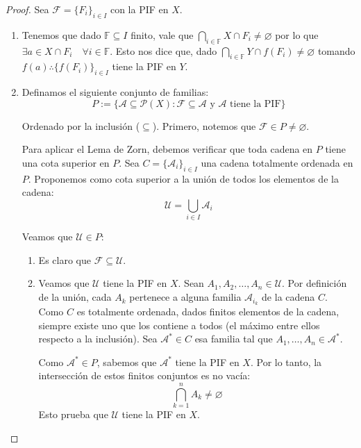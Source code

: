 \documentclass{article}
\theoremstyle{plain}
\theoremstyle{definition}
\begin{document}
\begin{proof}
    Sea \( \mathcal{F} = {\{ F_i \}}_{i \in I} \) con la PIF en \( X \).
    \begin{enumerate}
        \item Tenemos que dado \( \mathbb{F} \subseteq I \) finito, vale que \( \bigcap_{i \in \mathbb{F}} X \cap F_i \neq \varnothing \) por lo que \( \exists a \in X \cap F_i \quad \forall i \in \mathbb{F} \).
              Esto nos dice que, dado \( \bigcap_{i \in \mathbb{F}} Y \cap f(F_i) \neq \varnothing \) tomando \( f(a) \therefore {\{ f(F_i) \}}_{i \in I} \) tiene la PIF en \( Y \).
        \item Definamos el siguiente conjunto de familias:
              \[ P := \{ \mathcal{A} \subseteq \mathcal{P}(X) : \mathcal{F} \subseteq \mathcal{A} \text{ y } \mathcal{A} \text{ tiene la PIF} \} \]

              Ordenado por la inclusión (\( \subseteq \)). Primero, notemos que \( \mathcal{F} \in P \neq \varnothing \).

              Para aplicar el Lema de Zorn, debemos verificar que toda cadena en \( P \) tiene una cota superior en \( P \).
              Sea \( C = {\{ \mathcal{A}_i \}}_{i \in I} \) una cadena totalmente ordenada en \( P \). Proponemos como cota superior a la unión de todos los elementos de la cadena:
              \[ \mathcal{U} = \bigcup_{i \in I} \mathcal{A}_i \]

              Veamos que \( \mathcal{U} \in P \):
              \begin{enumerate}
                  \item Es claro que \( \mathcal{F} \subseteq \mathcal{U} \).
                  \item Veamos que \( \mathcal{U} \) tiene la PIF en \( X \). Sean \( A_1, A_2, \ldots, A_n \in \mathcal{U} \).
                        Por definición de la unión, cada \( A_k \) pertenece a alguna familia \( \mathcal{A}_{i_k} \) de la cadena \( C \).
                        Como \( C \) es totalmente ordenada, dados finitos elementos de la cadena, siempre existe uno que los contiene a todos (el máximo entre ellos respecto a la inclusión).
                        Sea \( \mathcal{A}^* \in C \) esa familia tal que \( A_1, \ldots, A_n \in \mathcal{A}^* \).

                        Como \( \mathcal{A}^* \in P \), sabemos que \( \mathcal{A}^* \) tiene la PIF en \( X \). Por lo tanto, la intersección de estos finitos conjuntos es no vacía:
                        \[ \bigcap_{k=1}^n A_k \neq \varnothing \]
                        Esto prueba que \( \mathcal{U} \) tiene la PIF en \( X \).
              \end{enumerate}


\end{enumerate}
\end{proof}
\end{document}
